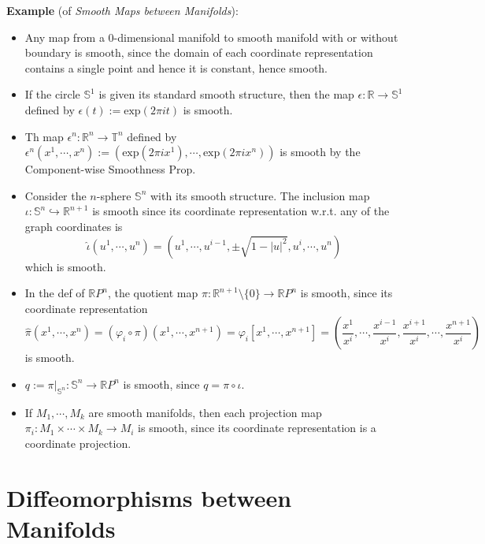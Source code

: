 \noindent\textbf{Example} (of \textit{Smooth Maps between Manifolds}):
\begin{itemize}
    \item Any map from a $0$-dimensional manifold to smooth manifold with or without boundary is smooth, since the domain of each coordinate representation contains a single point and hence it is constant, hence smooth.

    \item If the circle $\mathbb{S}^1$ is given its standard smooth structure, then the map $\epsilon:\mathbb{R} \to \mathbb{S}^1$ defined by $\epsilon(t):= \text{exp}(2\pi it)$ is smooth.

    \item Th map $\epsilon^n:\mathbb{R}^n \to \mathbb{T}^n$ defined by $\epsilon^n(x^1 ,\cdots, x^n):= (\text{exp}(2\pi ix^1) ,\cdots, \text{exp}(2\pi ix^n))$ is smooth by the Component-wise Smoothness Prop.

    \item Consider the $n$-sphere $\mathbb{S}^n$ with its smooth structure. The inclusion map $\iota: \mathbb{S}^n \hookrightarrow \mathbb{R}^{n+1}$ is smooth since its coordinate representation w.r.t. any of the graph coordinates is
    \[
    \widehat{\iota} (u^1 ,\cdots, u^n)= (u^1 ,\cdots, u^{i-1} ,\pm \sqrt{1-|u|^2} ,u^i,\cdots, u^n)
    \]
    which is smooth.

    \item In the def of $\mathbb{R}P^n$, the quotient map $\pi:\mathbb{R}^{n+1} \setminus \{0\} \to \mathbb{R}P^n$ is smooth, since its coordinate representation
    \[
    \widehat{\pi}(x^1 ,\cdots, x^n) = (\varphi_i\circ \pi)(x^1 ,\cdots, x^{n+1})= \varphi_i[x^1 ,\cdots, x^{n+1}]= (\frac{x^1}{x^i} ,\cdots, \frac{x^{i-1}}{x^i} ,\frac{x^{i+1}}{x^i} ,\cdots, \frac{x^{n+1}}{x^i})
    \]
    is smooth.

    \item $q:= \pi|_{\mathbb{S}^n}:\mathbb{S}^n \to \mathbb{R}P^n$ is smooth, since $q= \pi \circ \iota$.

    \item If $M_1 ,\cdots, M_k$ are smooth manifolds, then each projection map $\pi_i: M_1 \times \cdots \times M_k \to M_i$ is smooth, since its coordinate representation is a coordinate projection.
\end{itemize}

\section{Diffeomorphisms between Manifolds}

